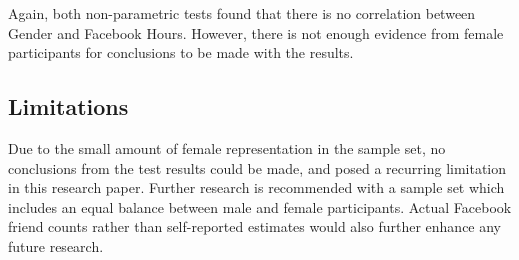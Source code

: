 Again, both non-parametric tests found that there is no correlation between Gender and Facebook Hours. However, there is not enough evidence from female participants for conclusions to be made with the results.

\subsection{Limitations}

Due to the small amount of female representation in the sample set, no conclusions from the test results could be made, and posed a recurring limitation in this research paper. Further research is recommended with a sample set which includes an equal balance between male and female participants. Actual Facebook friend counts rather than self-reported estimates would also further enhance any future research.